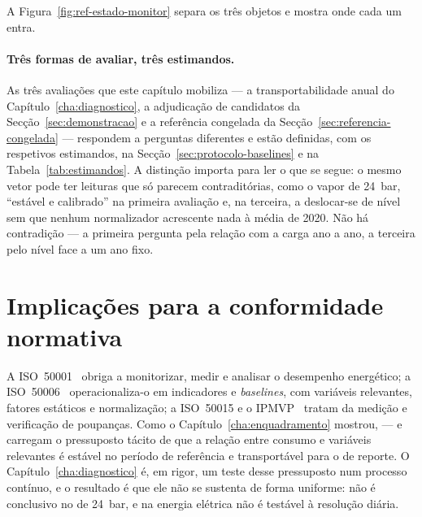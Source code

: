A Figura~\ref{fig:ref-estado-monitor} separa os três objetos e mostra onde cada um entra.


\paragraph{Três formas de avaliar, três estimandos.} As três avaliações que
este capítulo mobiliza --- a transportabilidade anual do
Capítulo~\ref{cha:diagnostico}, a adjudicação de candidatos da
Secção~\ref{sec:demonstracao} e a referência congelada da
Secção~\ref{sec:referencia-congelada} --- respondem a perguntas diferentes
e estão definidas, com os respetivos estimandos, na
Secção~\ref{sec:protocolo-baselines} e na Tabela~\ref{tab:estimandos}. A
distinção importa para ler o que se segue: o mesmo vetor pode ter leituras
que só parecem contraditórias, como o vapor de 24~bar, ``estável e
calibrado'' na primeira avaliação e, na terceira, a deslocar-se de nível sem
que nenhum normalizador acrescente nada à média de 2020. Não há contradição
--- a primeira pergunta pela relação com a carga ano a ano, a terceira pelo
nível face a um ano fixo.


\section{Implicações para a conformidade normativa}
\label{sec:implicacoes-normativas}

A ISO~50001~\cite{ISO50001_2018} obriga a monitorizar, medir e analisar o
desempenho energético; a ISO~50006~\cite{ISO50006_2014} operacionaliza-o em
indicadores e \emph{baselines}, com variáveis relevantes, fatores estáticos
e normalização; a ISO~50015 e o IPMVP~\cite{ISO50015_2014,IPMVP_2022} tratam
da medição e verificação de poupanças. Como o Capítulo~\ref{cha:enquadramento}
mostrou,  --- e carregam o pressuposto tácito de que a
relação entre consumo e variáveis relevantes é estável no período de
referência e transportável para o de reporte. O Capítulo~\ref{cha:diagnostico}
é, em rigor, um teste desse pressuposto num processo contínuo, e o resultado
é que ele não se sustenta de forma uniforme: 
não é conclusivo no de 24~bar, e na energia elétrica não é testável à
resolução diária.

